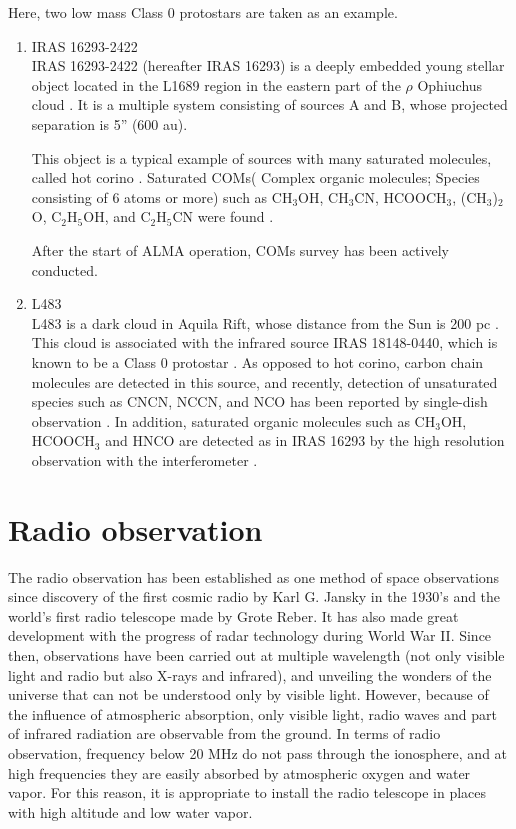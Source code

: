 Here, two low mass Class 0 protostars are taken as an example.
\begin{enumerate}
  \item IRAS 16293-2422 \\
IRAS 16293-2422 (hereafter IRAS 16293) is a deeply embedded young stellar object located 
in the L1689 region in the eastern part of the $\rho$ Ophiuchus cloud \citep[at d = 120 pc][]{Loinard+2008}.
It is a multiple system consisting of sources A and B, whose projected separation is 5'' (600 au).

This object is a typical example of sources with many saturated molecules, called hot corino \citep{Cazaux+2003}.
Saturated COMs( Complex organic molecules; Species consisting of 6 atoms or more) such as 
CH$_3$OH, CH$_3$CN, HCOOCH$_3$, (CH$_3$)$_2$O, C$_2$H$_5$OH, and C$_2$H$_5$CN were found 
\citep{Blake+1994,vanDishoeck+1995,Cazaux+2003}.

After the start of ALMA operation, COMs survey has been actively conducted. 
\citep[e.g., The ALMA Protostellar Interferometric Line Survey (PILS)][]{Jorgensen+2016}

  \item L483 \\
L483 is a dark cloud in Aquila Rift, whose distance from the Sun is 200 pc \citep{Jorgensen+2002,Rice+2006}.
This cloud is associated with the infrared source IRAS 18148-0440,
which is known to be a Class 0 protostar \citep{Fuller+1995,Chapman+2013}.
As opposed to hot corino, carbon chain molecules \citep[e.g., CS, CCH. See][]{Hirota+2009,Hirota+2010}
 are detected in this source, and 
recently, detection of unsaturated species such as CNCN, NCCN, and NCO has been reported by single-dish observation \citep{Agndez+2018,Marcelino+2018}.
In addition, saturated organic molecules such as CH$_3$OH, HCOOCH$_3$ and HNCO are 
detected as in IRAS 16293 by the high resolution observation with the interferometer \citep{Oya+2018b}.
\end{enumerate}

\newpage
\section{Radio observation}
The radio observation has been established as one method of space observations 
since discovery of the first cosmic radio by Karl G. Jansky in the 1930's and the world's first radio telescope made by Grote Reber. 
It has also made great development with the progress of radar technology during World War II.
Since then, observations have been carried out at multiple wavelength (not only visible light and radio but also X-rays and infrared), 
and unveiling the wonders of the universe that can not be understood only by visible light.
However, because of the influence of atmospheric absorption, only visible light, radio waves and part of infrared radiation are observable from the ground.
In terms of radio observation, frequency below 20 MHz do not pass through the ionosphere, 
and at high frequencies they are easily absorbed by atmospheric oxygen and water vapor. 
For this reason, it is appropriate to install the radio telescope in places with high altitude and low water vapor. 

